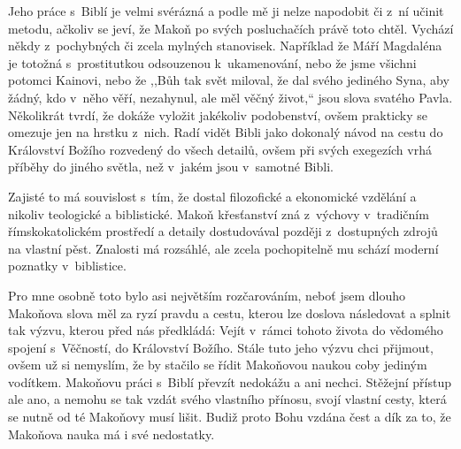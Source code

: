 Jeho práce s~Biblí je velmi svérázná a podle mě ji nelze napodobit či z~ní
učinit metodu, ačkoliv se jeví, že Makoň po svých posluchačích právě toto chtěl.
Vychází někdy z~pochybných či zcela mylných stanovisek. Například že Máří
Magdaléna je totožná s~prostitutkou odsouzenou k~ukamenování, nebo že jsme
všichni potomci Kainovi, nebo že ,,Bůh tak svět miloval, že dal svého jediného
Syna, aby žádný, kdo v~něho věří, nezahynul, ale měl věčný život,`` jsou slova
svatého Pavla. Několikrát tvrdí, že dokáže vyložit jakékoliv podobenství, ovšem
prakticky se omezuje jen na hrstku z~nich. Radí vidět Bibli jako dokonalý návod
na cestu do Království Božího rozvedený do všech detailů, ovšem při svých
exegezích vrhá příběhy do jiného světla, než v~jakém jsou v~samotné Bibli.

Zajisté to má souvislost s~tím, že dostal filozofické a ekonomické vzdělání a
nikoliv teologické a biblistické. Makoň křesťanství zná z~výchovy v~tradičním
římskokatolickém prostředí a detaily dostudovával později z~dostupných zdrojů na
vlastní pěst. Znalosti má rozsáhlé, ale zcela pochopitelně mu schází moderní
poznatky v~biblistice.

Pro mne osobně toto bylo asi největším rozčarováním, neboť jsem dlouho Makoňova
slova měl za ryzí pravdu a cestu, kterou lze doslova následovat a splnit tak
výzvu, kterou před nás předkládá: Vejít v~rámci tohoto života do vědomého
spojení s~Věčností, do Království Božího. Stále tuto jeho výzvu chci přijmout,
ovšem už si nemyslím, že by stačilo se řídit Makoňovou naukou coby jediným
vodítkem. Makoňovu práci s~Biblí převzít nedokážu a ani nechci. Stěžejní přístup
ale ano, a nemohu se tak vzdát svého vlastního přínosu, svojí vlastní cesty,
která se nutně od té Makoňovy musí lišit. Budiž proto Bohu vzdána čest a dík za
to, že Makoňova nauka má i své nedostatky.
